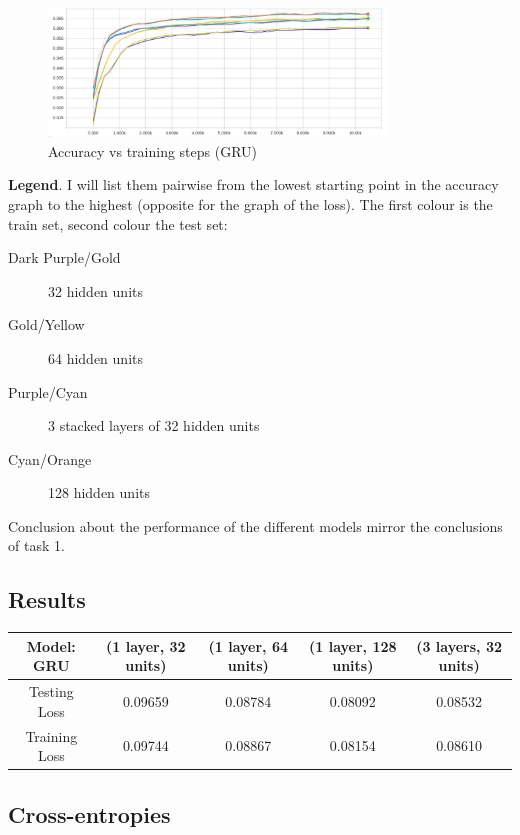 \documentclass{article}
\begin{document}
\begin{figure}[H]
  \centering
  \includegraphics[width=0.8\textwidth]{task2/GRU_task2_acc.png}
  \caption{Accuracy vs training steps (GRU)}
  \label{fig:GRU_acc_2}
\end{figure}

\textbf{Legend}. I will list them pairwise from the lowest starting point in the accuracy
graph to the highest (opposite for the graph of the loss). The first colour is the train set, second colour the test set:

\begin{description}
\item[Dark Purple/Gold] 32 hidden units
\item[Gold/Yellow] 64 hidden units
\item[Purple/Cyan] 3 stacked layers of 32 hidden units
\item[Cyan/Orange] 128 hidden units
\end{description}

Conclusion about the performance of the different models mirror the conclusions
of task 1.

\subsection{Results}

\begin{center}
  \begin{tabular}{ |c|c|c|c|c| } 
    \hline
    Model: GRU & (1 layer, 32 units) & (1 layer, 64 units) & (1 layer, 128 units) & (3 layers, 32 units) \\
    \hline
    Testing Loss & 0.09659 & 0.08784 & 0.08092 & 0.08532 \\
    Training Loss & 0.09744 & 0.08867 & 0.08154 & 0.08610 \\
    \hline
  \end{tabular}
\end{center}

\subsection{Cross-entropies}
\end{document}
